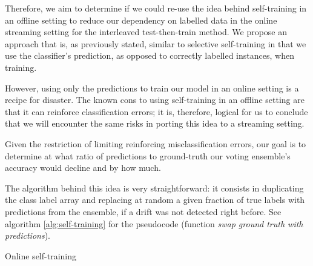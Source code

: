 Therefore, we aim to determine if we could re-use the idea behind self-training in an offline setting to reduce our dependency on labelled data in the online streaming setting for the interleaved test-then-train method. We propose an approach that is, as previously stated, similar to selective self-training in that we use the classifier's prediction, as opposed to correctly labelled instances, when training.

However, using only the predictions to train our model in an online setting is a recipe for disaster. The known cons to using self-training in an offline setting are that it can reinforce classification errors; it is, therefore, logical for us to conclude that we will encounter the same risks in porting this idea to a streaming setting.

Given the restriction of limiting reinforcing misclassification errors, our goal is to determine at what ratio of predictions to ground-truth our voting ensemble's accuracy would decline and by how much.

The algorithm behind this idea is very straightforward: it consists in duplicating the class label array and replacing at random a given fraction of true labels with predictions from the ensemble, if a drift was not detected right before. See algorithm \ref{alg:self-training} for the pseudocode (function \textit{swap ground truth with predictions}).

\begin{algorithm}

\caption{\label{alg:self-training}Online self-training}
\end{algorithm}


